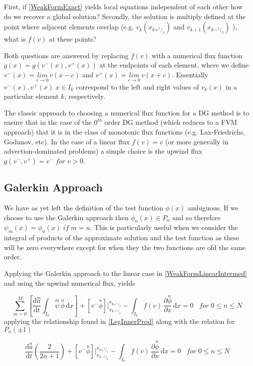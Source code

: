 \documentclass[letterpaper]{article}
\begin{document}
First, if \eqref{WeakFormExact} yields local equations independent of each other how do we recover a global solution? Secondly, the solution is multiply defined at the point where adjacent elements overlap (e.g. $v_k(x_{k+^1\!/_2})$ and $v_{k+1}(x_{k-^1\!/_2})$ ), what is $f(v)$ at these points?

Both questions are answered by replacing $f(v)$ with a numerical flux function $g(x) = g(v^-(x),v^+(x))$ at the endpoints of each element, where we define $v^-(x) = \underset{c \to 0}{lim} \,v(x-c)$ and $v^+(x) = \underset{c \to 0}{lim} \,v(x+c)$. Essentially $v^-(x),v^+(x) \;x \in I_k$ correspond to the left and right values of $v_k(x)$ in a particular element $k$, respectively.

The classic approach to choosing a numerical flux function for a DG method is to ensure that in the case of the $0^{th}$ order DG method (which reduces to a FVM approach) that it is in the class of monotonic flux functions (e.g. Lax-Friedrichs, Godunov, etc). In the case of a linear flux $f(v) = v$ (or more generally in advection-dominated problems) a simple choice is the upwind flux $g(v^-,v^+) = v^- \;for\; v>0$.

\subsection{Galerkin Approach}
We have as yet left the definition of the test function $\phi(x)$ ambiguous. If we choose to use the Galerkin approach then $\phi_n(x) \in P_n$ and so therefore $\psi_m(x) = \phi_n(x) \;if\; m=n$. This is particularly useful when we consider the integral of products of the approximate solution and the test function as these will be zero everywhere except for when they the two functions are ofd the same order.

Applying the Galerkin approach to the linear case in \eqref{WeakFormLinearIntermed} and using the upwind numerical flux, yields

\begin{equation}\label{WeakFormLinearIntermed2}
\sum_{m=0}^M \left[ \frac{\mathrm{d}\overset{m}{a}}{\mathrm{d} t} \int_{I_k}\! \overset{m}{\psi} \, \overset{n}{\phi} \,\mathrm{d}x \right] + [v^-\overset{n}{\phi}] \Big\rvert_{x_{k-^1\!/_2}}^{x_{k+^1\!/_2}} -  \int_{I_k}\! f(v) \,\frac{\partial \overset{n}{\phi}}{\partial x} \,\mathrm{d}x = 0 \;\;\; for \; 0 \leq n \leq N
\end{equation}
applying the relationship found in \eqref{LegInnerProd} along with the relation for $P_n(\pm 1)$

\begin{equation}\label{WeakFormLinear}
\frac{\mathrm{d}\overset{n}{a}}{\mathrm{d} t}\left(\frac{2}{2n+1}\right) + [v^-\overset{n}{\phi}] \Big\rvert_{x_{k-^1\!/_2}}^{x_{k+^1\!/_2}} -  \int_{I_k}\! f(v) \,\frac{\partial \overset{n}{\phi}}{\partial x} \,\mathrm{d}x = 0 \;\;\; for \; 0 \leq n \leq N
\end{equation}
\end{document}
